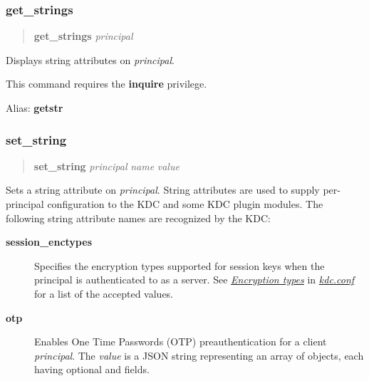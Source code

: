\documentclass[letterpaper,10pt,english]{sphinxmanual}
\begin{document}
\subsubsection{get\_strings}
\label{admin/admin_commands/kadmin_local:id9}\label{admin/admin_commands/kadmin_local:get-strings}\label{admin/admin_commands/kadmin_local:list-principals-end}\begin{quote}

\textbf{get\_strings} \emph{principal}
\end{quote}

Displays string attributes on \emph{principal}.

This command requires the \textbf{inquire} privilege.

Alias: \textbf{getstr}
\label{admin/admin_commands/kadmin_local:get-strings-end}

\subsubsection{set\_string}
\label{admin/admin_commands/kadmin_local:id10}\label{admin/admin_commands/kadmin_local:set-string}\label{admin/admin_commands/kadmin_local:get-strings-end}\begin{quote}

\textbf{set\_string} \emph{principal} \emph{name} \emph{value}
\end{quote}

Sets a string attribute on \emph{principal}.  String attributes are used to
supply per-principal configuration to the KDC and some KDC plugin
modules.  The following string attribute names are recognized by the
KDC:
\begin{description}
\item[{\textbf{session\_enctypes}}] \leavevmode
Specifies the encryption types supported for session keys when the
principal is authenticated to as a server.  See
{\hyperref[admin/conf_files/kdc_conf:encryption-types]{\emph{Encryption types}}} in {\hyperref[admin/conf_files/kdc_conf:kdc-conf-5]{\emph{kdc.conf}}} for a list of the
accepted values.

\item[{\textbf{otp}}] \leavevmode
Enables One Time Passwords (OTP) preauthentication for a client
\emph{principal}.  The \emph{value} is a JSON string representing an array
of objects, each having optional  and  fields.

\end{description}
\end{document}
